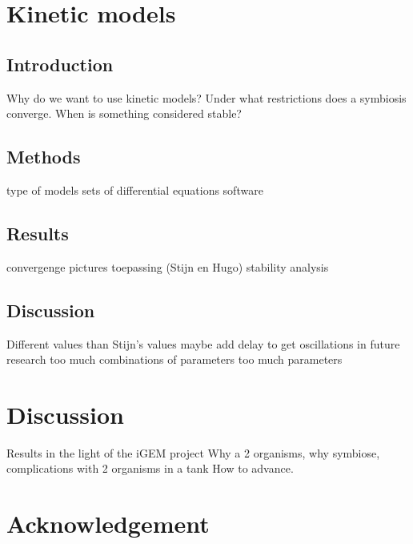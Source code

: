 \documentclass[12pt]{report}
\begin{document}
\chapter{Kinetic models}

\begin{abstract}
  
\end{abstract}

\section{Introduction}
Why do we want to use kinetic models?
Under what restrictions does a symbiosis converge.
When is something considered stable?

\section{Methods}
type of models
sets of differential equations
software

\section{Results}
convergenge
pictures
toepassing (Stijn en Hugo)
stability analysis

\section{Discussion}
Different values than Stijn's values
maybe add delay to get oscillations in future research
too much combinations of parameters
too much parameters

\chapter{Discussion}
Results in the light of the iGEM project
Why a 2 organisms, why symbiose, complications with 2 organisms in a tank
How to advance.


\chapter{Acknowledgement}
\end{document}
